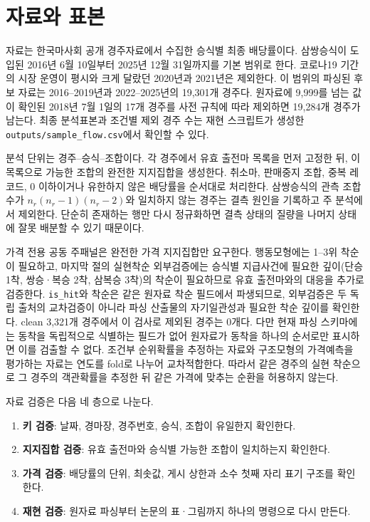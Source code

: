 \section{자료와 표본}

자료는 한국마사회 공개 경주자료에서 수집한 승식별 최종 배당률이다. 삼쌍승식이
도입된 2016년 6월 10일부터 2025년 12월 31일까지를 기본 범위로 한다. 코로나19
기간의 시장 운영이 평시와 크게 달랐던 2020년과 2021년은 제외한다. 이 범위의
파싱된 후보 자료는 2016--2019년과 2022--2025년의 19,301개 경주다. 원자료에
9,999를 넘는 값이 확인된 2018년 7월 1일의 17개 경주를 사전 규칙에 따라
제외하면 19,284개 경주가 남는다. 최종 분석표본과 조건별 제외 경주 수는 재현
스크립트가 생성한 \texttt{outputs/sample\_flow.csv}에서 확인할 수 있다.

분석 단위는 경주--승식--조합이다. 각 경주에서 유효 출전마 목록을 먼저 고정한
뒤, 이 목록으로 가능한 조합의 완전한 지지집합을 생성한다. 취소마, 판매중지
조합, 중복 레코드, 0 이하이거나 유한하지 않은 배당률을 순서대로 처리한다.
삼쌍승식의 관측 조합 수가 $n_r(n_r-1)(n_r-2)$와 일치하지 않는 경주는 결측
원인을 기록하고 주 분석에서 제외한다. 단순히 존재하는 행만 다시 정규화하면
결측 상태의 질량을 나머지 상태에 잘못 배분할 수 있기 때문이다.

가격 전용 공동 주패널은 완전한 가격 지지집합만 요구한다. 행동모형에는
1--3위 착순이 필요하고, 마지막 절의 실현착순 외부검증에는 승식별 지급사건에
필요한 깊이(단승 1착, 쌍승·복승 2착, 삼복승 3착)의 착순이 필요하므로 유효 출전마와의 대응을 추가로
검증한다. \texttt{is\_hit}와 착순은 같은 원자료 착순 필드에서 파생되므로,
외부검증은 두 독립 출처의 교차검증이 아니라 파싱 산출물의 자기일관성과 필요한
착순 깊이를 확인한다. clean 3,321개 경주에서 이 검사로 제외된 경주는 0개다.
다만 현재 파싱 스키마에는 동착을 독립적으로 식별하는 필드가 없어 원자료가
동착을 하나의 순서로만 표시하면 이를 검출할 수 없다.
조건부 순위확률을 추정하는 자료와 구조모형의 가격예측을 평가하는 자료는 연도를
fold로 나누어 교차적합한다. 따라서 같은 경주의 실현 착순으로 그 경주의
객관확률을 추정한 뒤 같은 가격에 맞추는 순환을 허용하지 않는다.

자료 검증은 다음 네 층으로 나눈다.

\begin{enumerate}
  \item \textbf{키 검증}: 날짜, 경마장, 경주번호, 승식, 조합이 유일한지 확인한다.
  \item \textbf{지지집합 검증}: 유효 출전마와 승식별 가능한 조합이 일치하는지 확인한다.
  \item \textbf{가격 검증}: 배당률의 단위, 최솟값, 게시 상한과 소수 첫째 자리 표기 구조를 확인한다.
  \item \textbf{재현 검증}: 원자료 파싱부터 논문의 표·그림까지 하나의 명령으로 다시 만든다.
\end{enumerate}

